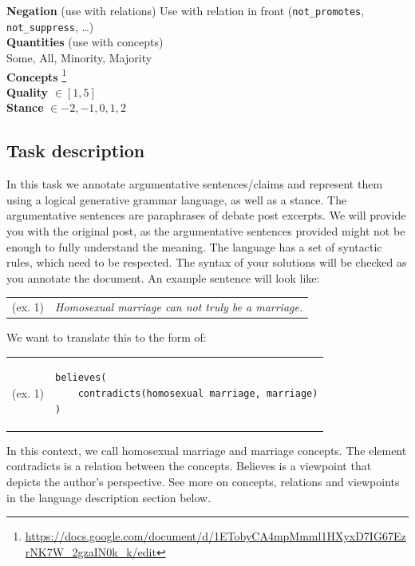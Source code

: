\noindent \textbf{Negation} (use with relations)
Use with relation in front (\texttt{not\_promotes}, \texttt{not\_suppress}, \dots) \\
 
\noindent \textbf{Quantities} (use with concepts) \\
Some, All, Minority, Majority \\
          
\noindent \textbf{Concepts} 
\footnote{\url{https://docs.google.com/document/d/1ETobyCA4mpMmml1HXyxD7IG67EzrNK7W_2gzaIN0k_k/edit}} \\

\noindent \textbf{Quality} $\in [1, 5]$ \\
 
\noindent \textbf{Stance} $ \in {-2, -1, 0, 1, 2}$ \\

\pagebreak

\subsection{Task description}

In this task we annotate argumentative sentences/claims and represent them
using a logical generative grammar language, as well as a stance. The
argumentative sentences are paraphrases of debate post excerpts. We will
provide you with the original post, as the argumentative sentences provided
might not be enough to fully understand the meaning. 
The language has a set of syntactic rules, which need to be respected. The
syntax of your solutions will be checked as you annotate the document. 
An example sentence will look like:
\noindent\begin{tabular}{@{}lp{}}
(ex. 1) & \textit{Homosexual marriage can not truly be a marriage.}
\end{tabular} \vspace{0.4cm}

\noindent We want to translate this to the form of: 

\begin{tabular}{@{}m{1.5cm}  m{4.5cm}}
(ex. 1) &  \begin{verbatim}
believes(
    contradicts(homosexual marriage, marriage)
)
\end{verbatim}
\end{tabular}

In this context, we call homosexual marriage and marriage concepts. The element
contradicts is a relation between the concepts. Believes is a viewpoint that
depicts the author's perspective. See more on concepts, relations and
viewpoints in the language description section below. 

